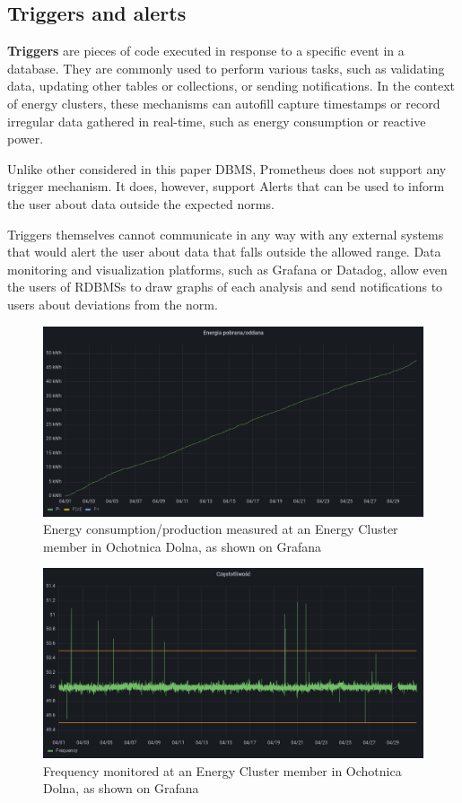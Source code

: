 \subsection{Triggers and alerts}
\par \textbf{Triggers} are pieces of code executed in response to a specific event in a database. They are commonly used to perform various tasks, such as validating data, updating other tables or collections, or sending notifications. In the context of energy clusters, these mechanisms can autofill capture timestamps or record irregular data gathered in real-time, such as energy consumption or reactive power.
\par Unlike other considered in this paper DBMS, Prometheus does not support any trigger mechanism. It does, however, support Alerts that can be used to inform the user about data outside the expected norms.
\par Triggers themselves cannot communicate in any way with any external systems that would alert the user about data that falls outside the allowed range. Data monitoring and visualization platforms, such as Grafana or Datadog, allow even the users of RDBMSs to draw graphs of each analysis and send notifications to users about deviations from the norm.
\begin{figure}[htbp]
 \centering
 \includegraphics[width=1\textwidth]{gfx/ochotnica-dolna-atende-energy-consumed-produced}
 \caption{Energy consumption/production measured at an Energy Cluster member in Ochotnica Dolna, as shown on Grafana}
 \label{fig:chapter02:energydistribution}
\end{figure}
\begin{figure}[htbp]
 \centering
 \includegraphics[width=1\textwidth]{gfx/ochotnica-dolna-atende-frequency}
 \caption{Frequency monitored at an Energy Cluster member in Ochotnica Dolna, as shown on Grafana}
 \label{fig:chapter02:energydistribution}
\end{figure}

